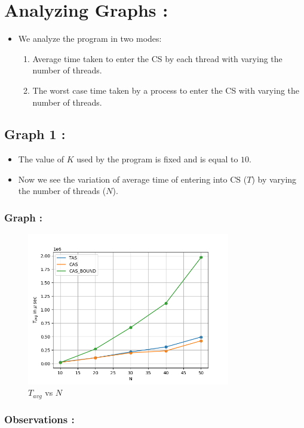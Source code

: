 \documentclass[12pt,a4paper]{article}
\begin{document}
	
	\section{Analyzing Graphs :}
	\begin{itemize}
		\item We analyze the program in two modes:
		\begin{enumerate}
			\item Average time taken to enter the CS by each thread with varying the number of threads.
			\item The worst case time taken by a process to enter the CS with varying the number of threads.
		\end{enumerate}
	\end{itemize}
	
	\subsection{ Graph 1 :}
	\begin{itemize}
		\item The value of $K$ used by the program is fixed and is equal to $10$.
		\item Now we see the variation of average time of entering into CS ($T$) by varying the number of threads ($N$).
	\end{itemize}
	
	
	\subsubsection{Graph :}
	\begin{figure}[H]
		\centering
		\includegraphics[width=0.79\textwidth]{average.png}
		\caption{$T_{avg}$ vs $N$ }
	\end{figure}
\pagebreak
	\subsubsection{Observations :}
\end{document}
